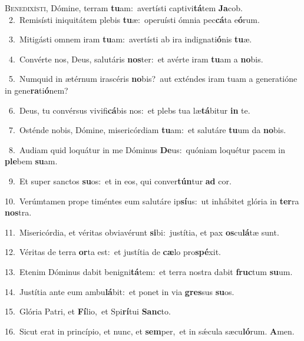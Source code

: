 \lettrine{\initial\textcolor{\initialcolor}{B}}{enedixísti,} Dómine, terram \textbf{tu}\-am:~\star avertísti captivi\-\textbf{tá}\-tem \textbf{Ja}\-cob.\\
{\numbfont\textcolor{\numbcolor}{~2.}}~Remisísti iniquitátem plebis \textbf{tu}\-æ:~\star operuísti ómnia pec\-\textbf{cá}\-ta e\-\textbf{ó}\-rum.\par
{\numbfont\textcolor{\numbcolor}{~3.}}~Mitigásti omnem iram \textbf{tu}\-am:~\star avertísti ab ira indignati\-\textbf{ó}\-nis \textbf{tu}\-æ.\par
{\numbfont\textcolor{\numbcolor}{~4.}}~Convérte nos, Deus, salutáris \textbf{nos}\-ter:~\star et avérte iram \textbf{tu}\-am a \textbf{no}\-bis.\par
{\numbfont\textcolor{\numbcolor}{~5.}}~Numquid in ætérnum irascéris \textbf{no}\-bis?~\star aut exténdes iram tuam a generatióne in gene\-\textbf{ra}\-ti\-\textbf{ó}\-nem?\par
{\numbfont\textcolor{\numbcolor}{~6.}}~Deus, tu convérsus vivifi\-\textbf{cá}\-bis nos:~\star et plebs tua læ\-\textbf{tá}\-bitur \textbf{in} te.\par
{\numbfont\textcolor{\numbcolor}{~7.}}~Osténde nobis, Dómine, misericórdiam \textbf{tu}\-am:~\star et salutáre \textbf{tu}\-um da \textbf{no}\-bis.\par
{\numbfont\textcolor{\numbcolor}{~8.}}~Audiam quid loquátur in me Dóminus \textbf{De}\-us:~\star quóniam loquétur pacem in \textbf{ple}\-bem \textbf{su}\-am.\par
{\numbfont\textcolor{\numbcolor}{~9.}}~Et super sanctos \textbf{su}\-os:~\star et in eos, qui conver\-\textbf{tún}\-tur \textbf{ad} cor.\par
{\numbfont\textcolor{\numbcolor}{10.}}~Verúmtamen prope timéntes eum salutáre ip\-\textbf{sí}\-us:~\star ut inhábitet glória in \textbf{ter}\-ra \textbf{nos}\-tra.\par
{\numbfont\textcolor{\numbcolor}{11.}}~Misericórdia, et véritas obviavérunt \textbf{si}\-bi:~\star justítia, et pax \textbf{os}\-cu\-\textbf{lá}\-tæ sunt.\par
{\numbfont\textcolor{\numbcolor}{12.}}~Véritas de terra \textbf{or}\-ta est:~\star et justítia de \textbf{cæ}\-lo pro\-\textbf{spé}\-xit.\par
{\numbfont\textcolor{\numbcolor}{13.}}~Etenim Dóminus dabit benigni\-\textbf{tá}\-tem:~\star et terra nostra dabit \textbf{fruc}\-tum \textbf{su}\-um.\par
{\numbfont\textcolor{\numbcolor}{14.}}~Justítia ante eum ambu\-\textbf{lá}\-bit:~\star et ponet in via \textbf{gres}\-sus \textbf{su}\-os.\par
{\numbfont\textcolor{\numbcolor}{15.}}~Glória Patri, et \textbf{Fí}\-lio,~\star et Spi\-\textbf{rí}\-tui \textbf{Sanc}\-to.\par
{\numbfont\textcolor{\numbcolor}{16.}}~Sicut erat in princípio, et nunc, et \textbf{sem}\-per,~\star et in sǽcula sæcu\-\textbf{ló}\-rum. \textbf{A}\-men.\par
